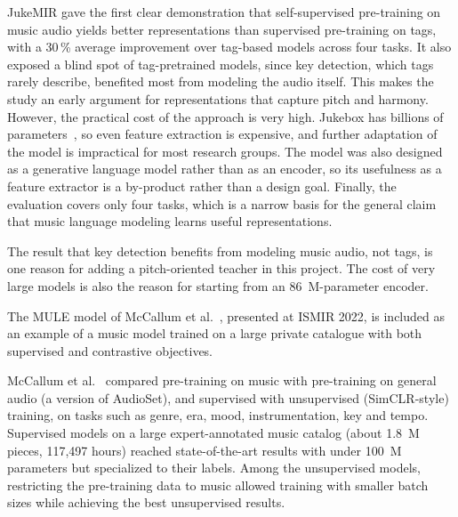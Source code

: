 \documentclass{FastFyp}
\begin{document}
\lrcritical
JukeMIR gave the first clear demonstration that self-supervised pre-training on music audio yields better representations than supervised pre-training on tags, with a 30\,\% average improvement over tag-based models across four tasks. It also exposed a blind spot of tag-pretrained models, since key detection, which tags rarely describe, benefited most from modeling the audio itself. This makes the study an early argument for representations that capture pitch and harmony. However, the practical cost of the approach is very high. Jukebox has billions of parameters~\cite{ref:Li:2024mert}, so even feature extraction is expensive, and further adaptation of the model is impractical for most research groups. The model was also designed as a generative language model rather than as an encoder, so its usefulness as a feature extractor is a by-product rather than a design goal. Finally, the evaluation covers only four tasks, which is a narrow basis for the general claim that music language modeling learns useful representations.

\lrrelation
The result that key detection benefits from modeling music audio, not tags, is one reason for adding a pitch-oriented teacher in this project. The cost of very large models is also the reason for starting from an 86~M-parameter encoder.

The MULE model of McCallum et al.~\cite{ref:McCallum:2022mule}, presented at ISMIR 2022, is included as an example of a music model trained on a large private catalogue with both supervised and contrastive objectives.

\lrsummary
McCallum et al.~\cite{ref:McCallum:2022mule} compared pre-training on music with pre-training on general audio (a version of AudioSet), and supervised with unsupervised (SimCLR-style) training, on tasks such as genre, era, mood, instrumentation, key and tempo. Supervised models on a large expert-annotated music catalog (about 1.8~M pieces, 117,497 hours) reached state-of-the-art results with under 100~M parameters but specialized to their labels. Among the unsupervised models, restricting the pre-training data to music allowed training with smaller batch sizes while achieving the best unsupervised results.
\end{document}

